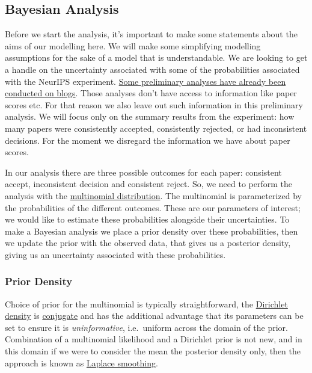 \hypertarget{bayesian-analysis}{%
\subsection{Bayesian Analysis}\label{bayesian-analysis}}

Before we start the analysis, it's important to make some statements
about the aims of our modelling here. We will make some simplifying
modelling assumptions for the sake of a model that is understandable. We
are looking to get a handle on the uncertainty associated with some of
the probabilities associated with the NeurIPS experiment.
\href{http://inverseprobability.com/2015/01/16/blogs-on-the-NeurIPS-experiment/}{Some
preliminary analyses have already been conducted on blogs}. Those
analyses don't have access to information like paper scores etc. For
that reason we also leave out such information in this preliminary
analysis. We will focus only on the summary results from the experiment:
how many papers were consistently accepted, consistently rejected, or
had inconsistent decisions. For the moment we disregard the information
we have about paper scores.

In our analysis there are three possible outcomes for each paper:
consistent accept, inconsistent decision and consistent reject. So, we
need to perform the analysis with the
\href{http://en.wikipedia.org/wiki/Multinomial_distribution}{multinomial
distribution}. The multinomial is parameterized by the probabilities of
the different outcomes. These are our parameters of interest; we would
like to estimate these probabilities alongside their uncertainties. To
make a Bayesian analysis we place a prior density over these
probabilities, then we update the prior with the observed data, that
gives us a posterior density, giving us an uncertainty associated with
these probabilities.

\hypertarget{prior-density}{%
\subsubsection{Prior Density}\label{prior-density}}

Choice of prior for the multinomial is typically straightforward, the
\href{http://en.wikipedia.org/wiki/Dirichlet_distribution}{Dirichlet
density} is
\href{http://en.wikipedia.org/wiki/Conjugate_prior}{conjugate} and has
the additional advantage that its parameters can be set to ensure it is
\emph{uninformative}, i.e.~uniform across the domain of the prior.
Combination of a multinomial likelihood and a Dirichlet prior is not
new, and in this domain if we were to consider the mean the posterior
density only, then the approach is known as
\href{http://en.wikipedia.org/wiki/Additive_smoothing}{Laplace
smoothing}.

